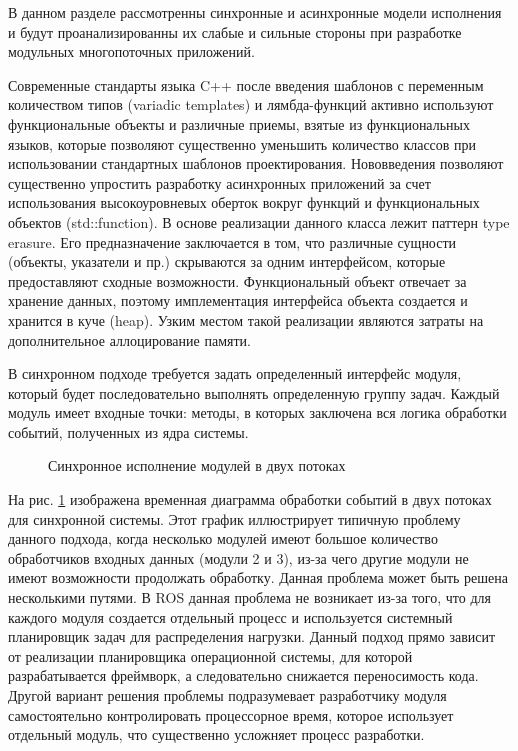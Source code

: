 В данном разделе рассмотренны синхронные и асинхронные модели исполнения и будут проанализированны их слабые и сильные стороны при разработке модульных многопоточных приложений.

Современные стандарты языка C++ после введения шаблонов с переменным количеством типов (variadic templates) и лямбда-функций активно используют функциональные объекты и различные приемы, взятые из функциональных языков, которые позволяют существенно уменьшить количество классов при использовании стандартных шаблонов проектирования. Нововведения позволяют существенно упростить разработку асинхронных приложений за счет использования высокоуровневых оберток вокруг функций и функциональных объектов (std::function). В основе реализации данного класса лежит паттерн type erasure. Его предназначение заключается в том, что различные сущности (объекты, указатели и пр.) скрываются за одним интерфейсом, которые предоставляют сходные возможности. Функциональный объект отвечает за хранение данных, поэтому имплементация интерфейса объекта создается и хранится в куче (heap). Узким местом такой реализации являются затраты на дополнительное аллоцирование памяти.


В синхронном подходе требуется задать определенный интерфейс модуля, который будет последовательно выполнять определенную группу задач. Каждый модуль имеет входные точки: методы, в которых заключена вся логика обработки событий, полученных из ядра системы.

\begin{figure}[h]
    \caption{Синхронное исполнение модулей в двух потоках}
    \label{im:2_1_1_sinc}
\end{figure}

На рис. \ref{im:2_1_1_sinc} изображена временная диаграмма обработки событий в двух потоках для синхронной системы. Этот график иллюстрирует типичную проблему данного подхода, когда несколько модулей имеют большое количество обработчиков входных данных (модули 2 и 3), из-за чего другие модули не имеют возможности продолжать обработку. Данная проблема может быть решена несколькими путями. В ROS данная проблема не возникает из-за того, что для каждого модуля создается отдельный процесс и используется системный планировщик задач для распределения нагрузки. Данный подход прямо зависит от реализации планировщика операционной системы, для которой разрабатывается фреймворк, а следовательно снижается переносимость кода. Другой вариант решения проблемы подразумевает разработчику модуля самостоятельно контролировать процессорное время, которое использует отдельный модуль, что существенно усложняет процесс разработки.


